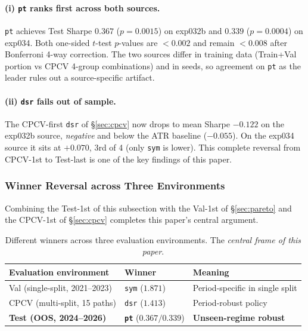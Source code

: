 \documentclass[11pt, a4paper]{article}
\begin{document}
\paragraph{(i) \texttt{pt} ranks first across both sources.}
\texttt{pt} achieves Test Sharpe $0.367$ ($p = 0.0015$) on exp032b and
$0.339$ ($p = 0.0004$) on exp034. Both one-sided $t$-test $p$-values are
$< 0.002$ and remain $< 0.008$ after Bonferroni 4-way correction. The two
sources differ in training data (Train+Val portion vs CPCV 4-group
combinations) and in seeds, so agreement on \texttt{pt} as the leader rules
out a source-specific artifact.

\paragraph{(ii) \texttt{dsr} fails out of sample.}
The CPCV-first \texttt{dsr} of \S\ref{sec:cpcv} now drops to mean Sharpe
$-0.122$ on the exp032b source, \emph{negative} and below the ATR baseline
($-0.055$). On the exp034 source it sits at $+0.070$, 3rd of 4 (only
\texttt{sym} is lower). This complete reversal from CPCV-1st to Test-last is
one of the key findings of this paper.

\subsubsection{Winner Reversal across Three Environments}
\label{sec:oos_three_env_reversal}

Combining the Test-1st of this subsection with the Val-1st of
\S\ref{sec:pareto} and the CPCV-1st of \S\ref{sec:cpcv} completes this paper's
central argument.

\begin{table}[!htbp]
\centering
\caption{Different winners across three evaluation environments. The
\emph{central frame of this paper}.}
\begin{tabular}{lll}
\toprule
Evaluation environment & Winner & Meaning \\
\midrule
Val (single-split, 2021--2023) & \texttt{sym} ($1.871$) & Period-specific in single split \\
CPCV (multi-split, 15 paths) & \texttt{dsr} ($1.413$) & Period-robust policy \\
\textbf{Test (OOS, 2024--2026)} & \textbf{\texttt{pt}} ($0.367 / 0.339$) & \textbf{Unseen-regime robust} \\
\bottomrule
\end{tabular}
\label{tab:three_env_reversal}
\end{table}
\end{document}
